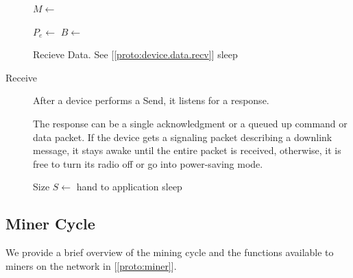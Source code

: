 \documentclass[10pt, nonatbib, nocopyrightspace, reprint]{sigplanconf}
\newenvironment{protocol}[2]{
  \begin{algorithm}[!htb]
    \DontPrintSemicolon
    \caption{#1}\label{#2}
}{
  \end{algorithm}
  \FloatBarrier
}
\newcommand{\protoref}[1]{[\autoref{#1}]}
\begin{document}
\begin{description}
    \begin{protocol}{Device Send Data}{proto:device.data.send}

       {
        $M \leftarrow $  \;
         \;
        \BlankLine

        $P_e \leftarrow $  \;
        $B \leftarrow $  \;
         \;
        \BlankLine

         {
           {
            Recieve Data. See \protoref{proto:device.data.recv}
          }
           {sleep}
        }
      }
    \end{protocol}


  \item [Receive] After a device performs a Send, it listens for a response.

    The response can be a single acknowledgment or a queued up command or data packet. If the device gets a signaling packet describing a downlink message, it stays awake until the entire packet is received, otherwise, it is free to turn its radio off or go into power-saving mode.

    \begin{protocol}{Device Receive Data}{proto:device.data.recv}

       {
        Size $S \leftarrow $  \;
         {
           {hand to application}
           {sleep}
        }
      }
    \end{protocol}


\end{description}


\subsection{Miner Cycle}\label{mining}

We provide a brief overview of the mining cycle and the functions available to miners on the network in \protoref{proto:miner}.
\end{document}

